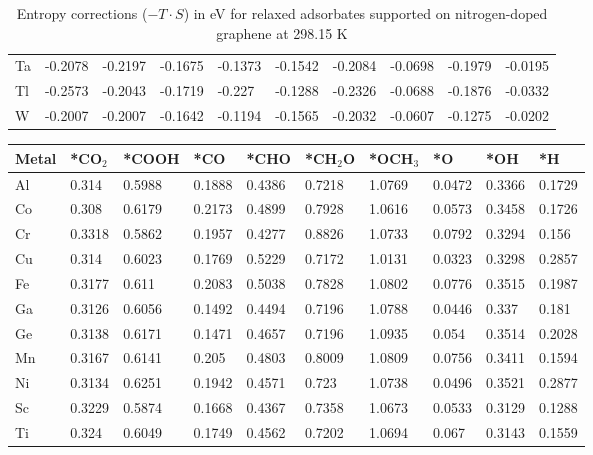 \begin{table}[h]
{\begin{tabular}{*{10}{l}}
      Ta & -0.2078 & -0.2197 & -0.1675 & -0.1373 & -0.1542 & -0.2084 & -0.0698 & -0.1979 & -0.0195 \\
      Tl & -0.2573 & -0.2043 & -0.1719 & -0.227  & -0.1288 & -0.2326 & -0.0688 & -0.1876 & -0.0332 \\
      W  & -0.2007 & -0.2007 & -0.1642 & -0.1194 & -0.1565 & -0.2032 & -0.0607 & -0.1275 & -0.0202 \\
      \hline
  \end{tabular}
  }
  \caption{Entropy corrections ($-T \cdot S$) in eV for relaxed adsorbates supported on nitrogen-doped graphene at 298.15 K}
  \label{si_table10}
\end{table}


\begin{table}[h]
  \centering
  {\fontsize{6}{12}\selectfont
  \begin{tabular}{*{10}{l}}
      \hline
      Metal & *CO$_2$ & *COOH & *CO & *CHO   & *CH$_2$O & *OCH$_3$ & *O & *OH    & *H     \\
      \hline
      Al & 0.314  & 0.5988 & 0.1888 & 0.4386 & 0.7218 & 1.0769 & 0.0472 & 0.3366 & 0.1729 \\
      Co & 0.308  & 0.6179 & 0.2173 & 0.4899 & 0.7928 & 1.0616 & 0.0573 & 0.3458 & 0.1726 \\
      Cr & 0.3318 & 0.5862 & 0.1957 & 0.4277 & 0.8826 & 1.0733 & 0.0792 & 0.3294 & 0.156  \\
      Cu & 0.314  & 0.6023 & 0.1769 & 0.5229 & 0.7172 & 1.0131 & 0.0323 & 0.3298 & 0.2857 \\
      Fe & 0.3177 & 0.611  & 0.2083 & 0.5038 & 0.7828 & 1.0802 & 0.0776 & 0.3515 & 0.1987 \\
      Ga & 0.3126 & 0.6056 & 0.1492 & 0.4494 & 0.7196 & 1.0788 & 0.0446 & 0.337  & 0.181  \\
      Ge & 0.3138 & 0.6171 & 0.1471 & 0.4657 & 0.7196 & 1.0935 & 0.054  & 0.3514 & 0.2028 \\
      Mn & 0.3167 & 0.6141 & 0.205  & 0.4803 & 0.8009 & 1.0809 & 0.0756 & 0.3411 & 0.1594 \\
      Ni & 0.3134 & 0.6251 & 0.1942 & 0.4571 & 0.723  & 1.0738 & 0.0496 & 0.3521 & 0.2877 \\
      Sc & 0.3229 & 0.5874 & 0.1668 & 0.4367 & 0.7358 & 1.0673 & 0.0533 & 0.3129 & 0.1288 \\
      Ti & 0.324  & 0.6049 & 0.1749 & 0.4562 & 0.7202 & 1.0694 & 0.067  & 0.3143 & 0.1559 \\

\end{tabular}}
\end{table}
